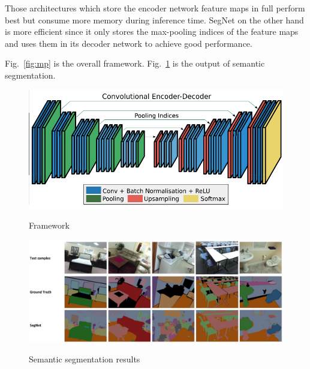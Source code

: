 \documentclass[]{IEEEtran}
\begin{document}
	Those architectures which store the encoder
	network feature maps in full perform best but consume more
	memory during inference time. SegNet on the other hand is
	more efficient since it only stores the max-pooling indices of
	the feature maps and uses them in its decoder network to
	achieve good performance.
		
	Fig.~\ref{fig:mp} is the overall framework. Fig.~\ref{fig:ss} is the output of semantic segmentation.
\newpage
\begin{figure}[!hbt]
		\vspace{2.3cm}
		\begin{center}
			\includegraphics[width=\columnwidth]{fw}
			\caption{Framework}
			\label{fig:mp}
		    \hspace{0.5cm}
			\includegraphics[width=\columnwidth]{rs}
			\caption{Semantic segmentation results}
			\label{fig:ss}
		\end{center}
	\end{figure}
\end{document}
